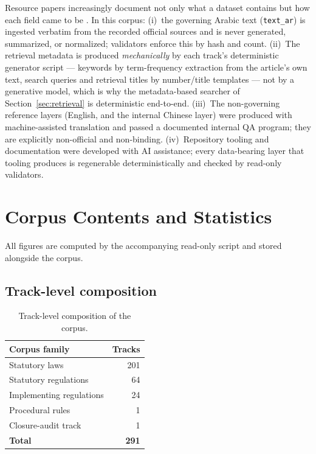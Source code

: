 \documentclass[11pt]{article}
\begin{document}
Resource papers increasingly document not only what a dataset contains but
how each field came to be \citep{bender2018data, gebru2021datasheets}. In
this corpus: (i)~the governing Arabic text (\texttt{text\_ar}) is ingested
verbatim from the recorded official sources and is never generated,
summarized, or normalized; validators enforce this by hash and count.
(ii)~The retrieval metadata is produced \emph{mechanically} by each track's
deterministic generator script --- keywords by term-frequency extraction
from the article's own text, search queries and retrieval titles by
number/title templates --- not by a generative model, which is why the
metadata-based searcher of Section~\ref{sec:retrieval} is deterministic
end-to-end. (iii)~The non-governing reference layers (English, and the
internal Chinese layer) were produced with machine-assisted translation and
passed a documented internal QA program; they are explicitly non-official
and non-binding. (iv)~Repository tooling and documentation were developed
with AI assistance; every data-bearing layer that tooling produces is
regenerable deterministically and checked by read-only validators.

\section{Corpus Contents and Statistics}
\label{sec:contents}

All figures are computed by the accompanying read-only script and stored
alongside the corpus.

\subsection{Track-level composition}

\begin{table}[t]
\centering
\small
\begin{tabular}{lr}
\toprule
\textbf{Corpus family} & \textbf{Tracks} \\
\midrule
Statutory laws & 201 \\
Statutory regulations & 64 \\
Implementing regulations & 24 \\
Procedural rules & 1 \\
Closure-audit track & 1 \\
\midrule
\textbf{Total} & \textbf{291} \\
\bottomrule
\end{tabular}
\caption{Track-level composition of the corpus.}
\label{tab:families}
\end{table}
\end{document}
